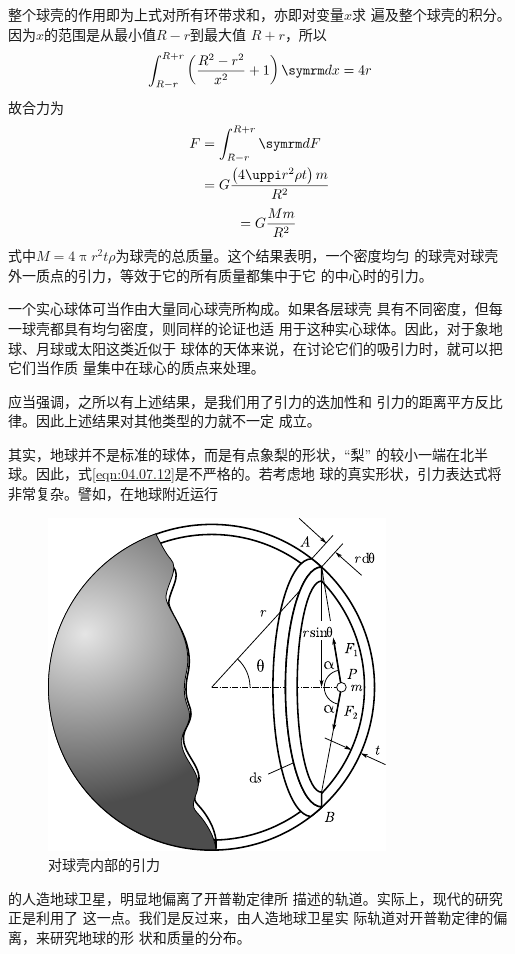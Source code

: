 整个球壳的作用即为上式对所有环带求和，亦即对变量$ x $求
遍及整个球壳的积分。因为$ x $的范围是从最小值$ R - r $到最大值
$ R + r $，所以
\begin{equation}\label{eqn:04.07.11}
 \int _ { R - r } ^ { R + r } \left( \frac { R ^ { 2 } - r ^ { 2 } } { x ^ { 2 } } + 1 \right) \dif x = 4 r
\end{equation}
故合力为
\begin{equation*}
 \begin{aligned}
 F &= \int _ { R - r } ^ { R + r } \dif F \\
&= G \frac { \left( 4 \uppi r ^ { 2 } \rho t \right) m } { R ^ { 2 } } \\
 \end{aligned}
\end{equation*}
\begin{equation}\label{eqn:04.07.12}
    \mbox \quad = G \frac { M m } { R ^ { 2 } }
\end{equation}
式中$ M = 4 \uppi r ^ { 2 } t \rho $为球壳的总质量。这个结果表明，一个密度均匀
的球壳对球壳外一质点的引力，等效于它的所有质量都集中于它
的中心时的引力。

一个实心球体可当作由大量同心球壳所构成。如果各层球壳
具有不同密度，但每一球壳都具有均匀密度，则同样的论证也适
用于这种实心球体。因此，对于象地球、月球或太阳这类近似于
球体的天体来说，在讨论它们的吸引力时，就可以把它们当作质
量集中在球心的质点来处理。

应当强调，之所以有上述结果，是我们用了引力的迭加性和
引力的距离平方反比律。因此上述结果对其他类型的力就不一定
成立。

其实，地球并不是标准的球体，而是有点象梨的形状，“梨”
的较小一端在北半球。因此，式\eqref{eqn:04.07.12}是不严格的。若考虑地
球的真实形状，引力表达式将非常复杂。譬如，在地球附近运行
\begin{figure}
    \vspace{-0.5em}
 \centering
 \includegraphics{figure/fig04.11}
 \caption{对球壳内部的引力}
 \label{fig:04.11}
\end{figure}
的人造地球卫星，明显地偏离了开普勒定律所
描述的轨道。实际上，现代的研究正是利用了
这一点。我们是反过来，由人造地球卫星实
际轨道对开普勒定律的偏离，来研究地球的形
状和质量的分布。

